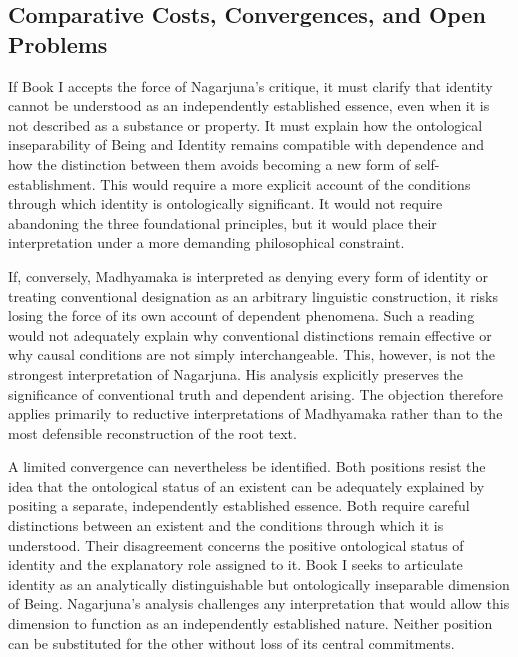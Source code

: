 \subsection{Comparative Costs, Convergences, and Open Problems}
\label{subsec:ch08_s18_ss19}

\label{para:VS.B01.P01.C08.S18.SS19.P001}
If Book I accepts the force of Nagarjuna's critique, it must clarify that identity cannot be understood as an independently established essence, even when it is not described as a substance or property. It must explain how the ontological inseparability of Being and Identity remains compatible with dependence and how the distinction between them avoids becoming a new form of self-establishment. This would require a more explicit account of the conditions through which identity is ontologically significant. It would not require abandoning the three foundational principles, but it would place their interpretation under a more demanding philosophical constraint.

\label{para:VS.B01.P01.C08.S18.SS19.P002}
If, conversely, Madhyamaka is interpreted as denying every form of identity or treating conventional designation as an arbitrary linguistic construction, it risks losing the force of its own account of dependent phenomena. Such a reading would not adequately explain why conventional distinctions remain effective or why causal conditions are not simply interchangeable. This, however, is not the strongest interpretation of Nagarjuna. His analysis explicitly preserves the significance of conventional truth and dependent arising. The objection therefore applies primarily to reductive interpretations of Madhyamaka rather than to the most defensible reconstruction of the root text.

\label{para:VS.B01.P01.C08.S18.SS19.P003}
A limited convergence can nevertheless be identified. Both positions resist the idea that the ontological status of an existent can be adequately explained by positing a separate, independently established essence. Both require careful distinctions between an existent and the conditions through which it is understood. Their disagreement concerns the positive ontological status of identity and the explanatory role assigned to it. Book I seeks to articulate identity as an analytically distinguishable but ontologically inseparable dimension of Being. Nagarjuna's analysis challenges any interpretation that would allow this dimension to function as an independently established nature. Neither position can be substituted for the other without loss of its central commitments.

